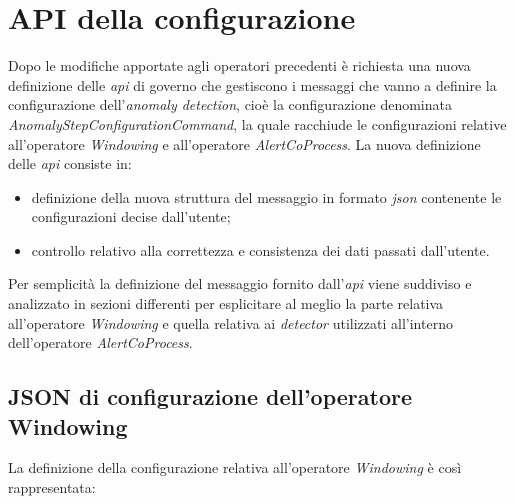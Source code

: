 
\section{API della configurazione}\label{sec:api-configurazione}
Dopo le modifiche apportate agli operatori precedenti è richiesta una nuova definizione delle \textit{\gls{api}} di governo che gestiscono i messaggi che vanno a definire la configurazione dell'\textit{anomaly detection}, cioè la configurazione denominata \textit{AnomalyStepConfigurationCommand}, la quale racchiude le configurazioni relative all'operatore \textit{Windowing} e all'operatore \textit{AlertCoProcess}. La nuova definizione delle \textit{\gls{api}} consiste in:

\begin{itemize}
	\item{definizione della nuova struttura del messaggio in formato \textit{\gls{json}} contenente le configurazioni decise dall'utente;}
	\item{controllo relativo alla correttezza e consistenza dei dati passati dall'utente.}
\end{itemize}
Per semplicità la definizione del messaggio fornito dall'\textit{\gls{api}} viene suddiviso e analizzato in sezioni differenti per esplicitare al meglio la parte relativa all'operatore \textit{Windowing} e quella relativa ai \textit{detector} utilizzati all'interno dell'operatore \textit{AlertCoProcess}.




\subsection{JSON di configurazione dell'operatore Windowing}\label{sec:json-windowing}
La definizione della configurazione relativa all'operatore \textit{Windowing} è così rappresentata:


